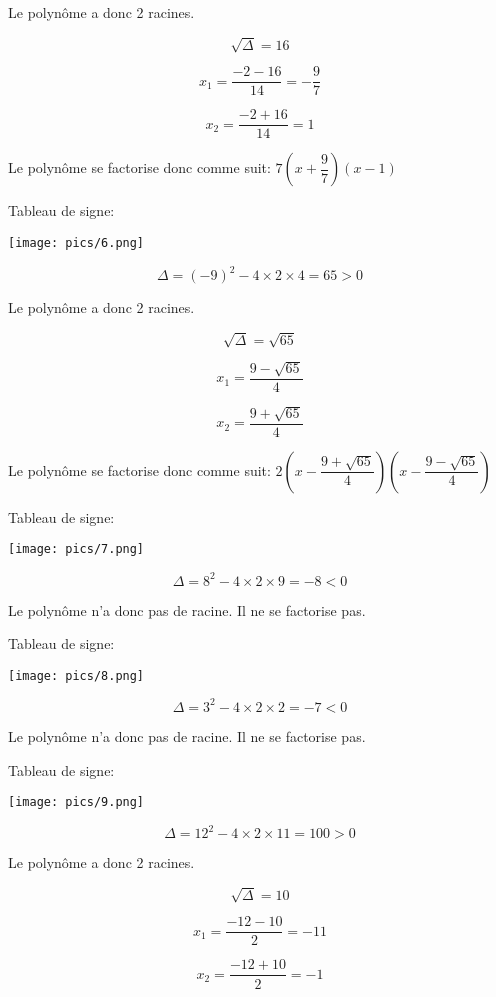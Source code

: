 \documentclass[a4paper,12pt]{scrartcl}
\begin{document}
Le polynôme a donc 2 racines.

$$\sqrt{\Delta} = 16$$

$$x_1 = \dfrac{-2 - 16}{14} = -\dfrac{9}{7}$$

$$x_2 = \dfrac{-2 + 16}{14} = 1$$

Le polynôme se factorise donc comme suit: $7\left(x + \dfrac{9}{7}\right)\left(x -1\right)$

Tableau de signe:

\texttt{[image: pics/6.png]}



$$\Delta = (-9)^2 - 4 \times 2 \times 4 = 65 > 0$$

Le polynôme a donc 2 racines.

$$\sqrt{\Delta} = \sqrt{65}$$

$$x_1 = \dfrac{9 - \sqrt{65}}{4}$$

$$x_2 = \dfrac{9 + \sqrt{65}}{4}$$

Le polynôme se factorise donc comme suit: $2\left(x - \dfrac{9 + \sqrt{65}}{4}\right)\left(x - \dfrac{9 - \sqrt{65}}{4}\right)$

Tableau de signe:

\texttt{[image: pics/7.png]}



$$\Delta = 8^2 - 4 \times 2 \times 9 = -8 < 0$$

Le polynôme n'a donc pas de racine. Il ne se factorise pas.

Tableau de signe:

\texttt{[image: pics/8.png]}



$$\Delta = 3^2 - 4 \times 2 \times 2 = -7 < 0$$

Le polynôme n'a donc pas de racine. Il ne se factorise pas.

Tableau de signe:

\texttt{[image: pics/9.png]}



$$\Delta = 12^2 - 4 \times 2 \times 11 = 100 > 0$$

Le polynôme a donc 2 racines.

$$\sqrt{\Delta} = 10$$

$$x_1 = \dfrac{-12 - 10}{2} = -11$$

$$x_2 = \dfrac{-12 + 10}{2} = -1$$
\end{document}
